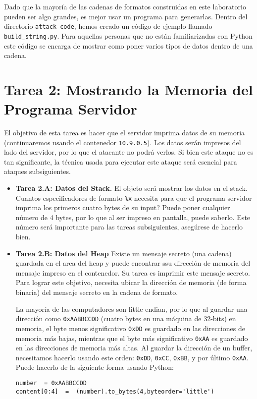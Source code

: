 Dado que la mayoría de las cadenas de formatos construidas en este laboratorio pueden ser algo grandes, es mejor usar un programa para generarlas. Dentro del directorio  \texttt{attack-code}, hemos creado un código de ejemplo llamado  \texttt{build\_string.py}. Para aquellas personas que no están familiarizadas con Python este código se encarga de mostrar como poner varios tipos de datos dentro de una cadena.



\section{Tarea 2: Mostrando la Memoria del Programa Servidor}

El objetivo de esta tarea es hacer que el servidor imprima datos de su memoria (continuaremos usando el contenedor \texttt{10.9.0.5}).
Los datos serán impresos del lado del servidor, por lo que el atacante no podrá verlos. Si bien este ataque no es tan significante, la técnica usada para ejecutar este ataque será esencial para ataques subsiguientes.


\begin{itemize} 
\item \textbf{Tarea 2.A: Datos del Stack.}
El objeto será mostrar los datos en el stack.
Cuantos especificadores de formato \texttt{\%x} necesita para que el programa servidor imprima los primeros cuatro bytes de su input? Puede poner cualquier número de 4 bytes, por lo que al ser impreso en pantalla, puede saberlo.
Este número será importante para las tareas subsiguientes, asegúrese de hacerlo bien.


\item \textbf{Tarea 2.B: Datos del Heap} 
Existe un mensaje secreto (una cadena) guardada en el area del heap y puede encontrar ssu dirección de memoria del mensaje impreso en el contenedor.
Su tarea es imprimir este mensaje secreto.
Para lograr este objetivo, necesita ubicar la dirección de memoria (de forma binaria) del mensaje secreto en la cadena de formato.

La mayoría de las computadores son little endian, por lo que al guardar una dirección como \texttt{0xAABBCCDD} (cuatro bytes en una máquina de 32-bits) en memoria, el byte menos significativo \texttt{0xDD} es guardado en las direcciones de memoria más bajas, mientras que el byte más significativo \texttt{0xAA} es guardado en las direcciones de memoria más altas. 
Al guardar la dirección de un buffer, necesitamos hacerlo usando este orden: \texttt{0xDD}, \texttt{0xCC}, \texttt{0xBB}, y por último \texttt{0xAA}.
Puede hacerlo de la siguiente forma usando Python:

\begin{lstlisting}
number  = 0xAABBCCDD
content[0:4]  =  (number).to_bytes(4,byteorder='little')
\end{lstlisting}
     
\end{itemize} 






